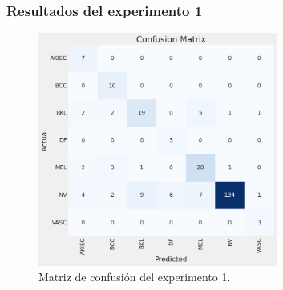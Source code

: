 \documentclass{beamer}
\begin{document}
\begin{frame}
  \frametitle{Resultados del experimento 1}

  \begin{figure}[H]
    \begin{center}
        \includegraphics[width=0.7\textwidth]{./Graphics/confussionmatrix_p1.png}
        \caption{Matriz de confusión del experimento 1.}
    \end{center}
  \end{figure}

\end{frame}
\end{document}
